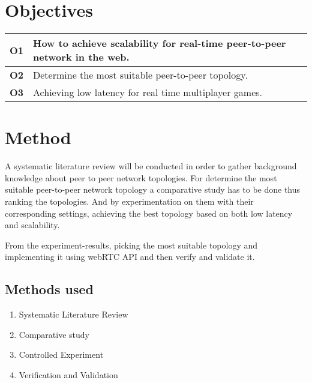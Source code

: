 \documentclass[12pt]{article}
\begin{document}
\section*{Objectives}

\begin{tabular} {|p{1.2cm}|p{11.6cm}|} \hline
\textbf{O1} & How to achieve scalability for real-time peer-to-peer network in the web. \\ \hline
\textbf{O2} & Determine the most suitable peer-to-peer topology. \\ \hline
\textbf{O3} & Achieving low latency for real time multiplayer games. \\ \hline
\end{tabular}

\section*{Method}
A systematic literature review will be conducted in order to gather background 
knowledge about peer to peer network topologies. For determine the most suitable 
peer-to-peer network topology a comparative study has to be done thus ranking the 
topologies. And by experimentation on them with their corresponding settings, 
achieving the best topology based on both low latency and scalability. 


\noindent\newline From the experiment-results, picking the most suitable topology 
and implementing it using webRTC API and then verify and validate it.

\subsection*{Methods used}
\begin{enumerate}
  \item Systematic Literature Review
  \item Comparative study
  \item Controlled Experiment
  \item Verification and Validation 
\end{enumerate}
\end{document}
